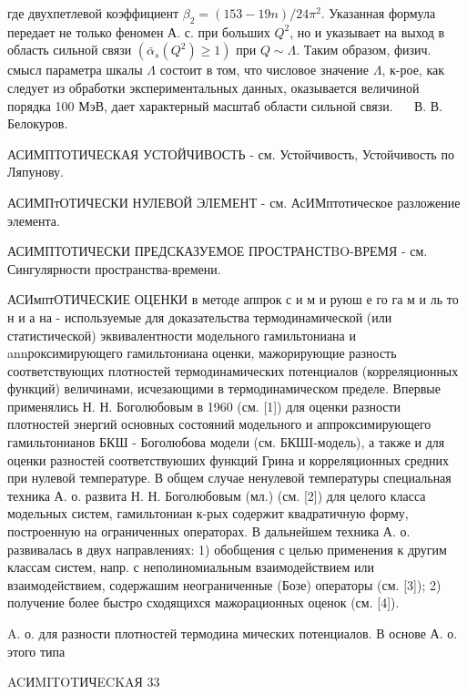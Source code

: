 \documentclass[10pt]{article}
\begin{document}
где двухпетлевой коэффициент $\beta_{2}=(153-19 n) / 24 \pi^{2}$. Указанная формула передает не только феномен А. с. при больших $Q^{2}$, но и указывает на выход в область сильной связи $\left(\bar{\alpha}_{s}\left(Q^{2}\right) \geqslant 1\right)$ при $Q \sim \Lambda$. Таким образом, физич. смысл параметра шкалы $\Lambda$ состоит в том, что числовое значение $\Lambda$, к-рое, как следует из обработки экспериментальных данных, оказывается величиной порядка 100 МэВ, дает характерный масштаб области сильной связи. $\quad$ В. В. Белокуров.



АСИМПТОТИЧЕСКАЯ УСТОЙЧИВОСТЬ - см. Устойчивость, Устойчивость по Ляпунову.



АСИМПтОТИЧЕСКИ НУЛЕВОЙ ЭЛЕМЕНТ - см. АсИМптотическое разложение элемента.



АСИМПТОТИЧЕСКИ ПРЕДСКАЗУЕМОЕ ПРОСТРАНСТBO-ВРЕМЯ - см. Сингулярности пространства-времени.



АСИмптОТИЧЕСКИЕ ОЦЕНКИ в методе аппрок с и м и руюш е го га м и ль то н и а на - используемые для доказательства термодинамической (или статистической) эквивалентности модельного гамильтониана и annроксимирующего гамильтониана оценки, мажорирующие разность соответствующих плотностей термодинамических потенциалов (корреляционных функций) величинами, исчезающими в термодинамическом пределе. Впервые применялись Н. Н. Боголюбовым в 1960 (см. [1]) для оценки разности плотностей энергий основных состояний модельного и аппроксимирующего гамильтонианов БКШ - Боголюбова модели (см. БКШI-модель), а также и для оценки разностей соответствуюших функций Грина и корреляционных средних при нулевой температуре. В общем случае ненулевой температуры специальная техника А. о. развита Н. Н. Боголюбовым (мл.) (см. [2]) для целого класса модельных систем, гамильтониан к-рых содержит квадратичную форму, построенную на ограниченных операторах. В дальнейшем техника А. о. развивалась в двух направлениях: 1) обобщения с целью применения к другим классам систем, напр. с неполиномиальным взаимодействием или взаимодействием, содержашим неограниченные (Бозе) операторы (см. [3]); 2) получение более быстро сходящихся мажорационных оценок (см. [4]).



A. о. для разности плотностей термодина мических потенциалов. В основе А. о. этого типа



ACИMITOTИЧECKAЯ 33
\end{document}
